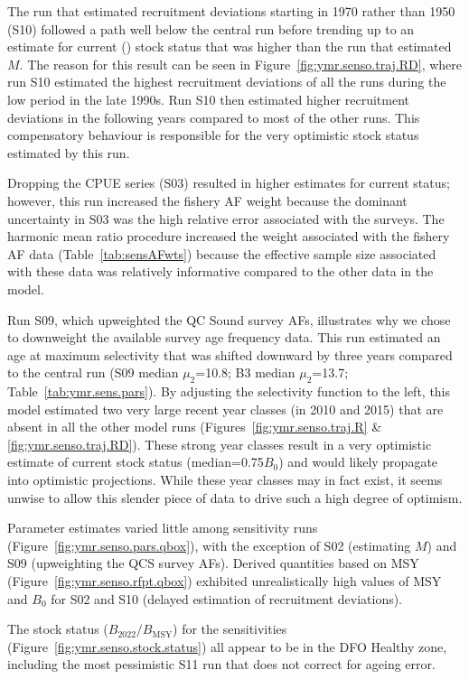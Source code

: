 \documentclass[11pt]{book}
\newcommand{\Bmsy}{B_\mathrm{MSY}}
\begin{document}
The run that estimated recruitment deviations starting in 1970 rather than 1950 (S10) followed a path well below the central run before trending up to an estimate for current (\currYear) stock status that was higher than the run that estimated $M$.
The reason for this result can be seen in Figure~\ref{fig:ymr.senso.traj.RD}, where run S10 estimated the highest recruitment deviations of all the runs during the low period in the late 1990s.
Run S10 then estimated higher recruitment deviations in the following years compared to most of the other runs.
This compensatory behaviour is responsible for the very optimistic stock status estimated by this run.

Dropping the CPUE series (S03) resulted in higher estimates for current status; however, this run increased the fishery AF weight because the dominant uncertainty in S03 was the high relative error associated with the surveys.
The harmonic mean ratio procedure increased the weight associated with the fishery AF data (Table~\ref{tab:sensAFwts}) because the effective sample size associated with these data was relatively informative compared to the other data in the model.

Run S09, which upweighted the QC Sound survey AFs, illustrates why we chose to downweight the available survey age frequency data.
This run estimated an age at maximum selectivity that was shifted downward by three years compared to the central run (S09 median $\mu_2$=10.8; B3 median $\mu_2$=13.7; Table~\ref{tab:ymr.sens.pars}).
By adjusting the selectivity function to the left, this model estimated two very large recent year classes (in 2010 and 2015) that are absent in all the other model runs (Figures~\ref{fig:ymr.senso.traj.R} \& \ref{fig:ymr.senso.traj.RD}).
These strong year classes result in a very optimistic estimate of current stock status (median=0.75$B_0$) and would likely propagate into optimistic projections.
While these year classes may in fact exist, it seems unwise to allow this slender piece of data to drive such a high degree of optimism.

Parameter estimates varied little among sensitivity runs (Figure~\ref{fig:ymr.senso.pars.qbox}), with the exception of S02 (estimating $M$) and S09 (upweighting the QCS survey AFs).
Derived quantities based on MSY (Figure~\ref{fig:ymr.senso.rfpt.qbox}) exhibited unrealistically high values of MSY and $B_0$ for S02 and S10 (delayed estimation of recruitment deviations).

The stock status ($B_{2022}/\Bmsy$) for the sensitivities (Figure~\ref{fig:ymr.senso.stock.status}) all appear to be in the DFO Healthy zone, including the most pessimistic S11 run that does not correct for ageing error.
\end{document}
